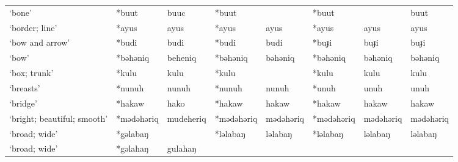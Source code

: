 \begin{landscape}
\begin{longtable}[c]{@{}p{3cm}<{\raggedright}p{2.75cm}<{\raggedright}p{2.75cm}<{\raggedright}p{2.75cm}<{\raggedright}p{2.75cm}<{\raggedright}p{2.75cm}<{\raggedright}p{2.75cm}<{\raggedright}p{2.75cm}<{\raggedright}@{}}
`bone'                                               & *buut        & buuc                          & *buut          &                            & *buut            &                          & buut                              \\
`border; line'                                       & *ayus        & ayus                          & *ayus          & ayus                       & *ayus            & ayus                     & ayus                              \\
`bow and arrow'                                      & *budi        & budi                          & *budi          & budi                       & *buɟi            & buɟi                     & buɟi                              \\
`bow'                                                & *bəhəniq     & beheniq                       & *bəhəniq       & bəhəniq                    & *bəhəniq         & bəhəniq                  & bəhəniq                           \\
`box; trunk'                                         & *kulu        & kulu                          & *kulu          &                            & *kulu            & kulu                     & kulu                              \\
`breasts'                                            & *nunuh       & nunuh                         & *nunuh         & nunuh                      & *unuh            & unuh                     & unuh                              \\
`bridge'                                             & *hakaw       & hako                          & *hakaw         & hakaw                      & *hakaw           & hakaw                    & hakaw                             \\
`bright; beautiful; smooth'                          & *mədəhəriq   & mudeheriq                     & *mədəhəriq     & mədəhəriq                  & *mədəhəriq       & mədəhəriq                & mədəhəriq                         \\
`broad; wide'                                        & *gəlabaŋ     &                               & *ləlabaŋ       & ləlabaŋ                    & *ləlabaŋ         & ləlabaŋ                  & ləlabaŋ                           \\
`broad; wide'                                        & *gəlahaŋ     & gulahaŋ                       &                &                            &                  &                          &                                   \\

\end{longtable}
\end{landscape}
